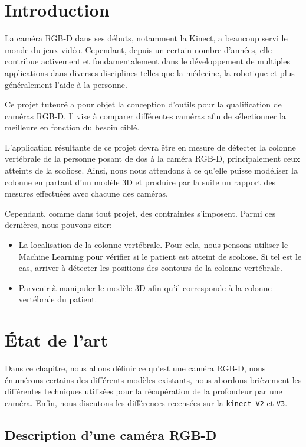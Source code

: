\documentclass[a4paper, 12pt]{book}
\begin{document}
\chapter*{Introduction}
La caméra RGB-D dans ses débuts, notamment la Kinect, a beaucoup
servi le monde du jeux-vidéo. Cependant, depuis un certain nombre d'années, elle contribue activement et fondamentalement dans le développement
de multiples applications dans diverses disciplines telles que la médecine, la
robotique et plus généralement l'aide à la personne.
\par Ce projet tuteuré a pour objet la conception d'outils pour la qualification de caméras RGB-D. Il vise à comparer différentes caméras afin de sélectionner la meilleure en
fonction du besoin ciblé.
\par L'application résultante de ce projet devra être en mesure de détecter la colonne vertébrale de la personne posant de dos à la caméra RGB-D, principalement ceux atteints de la scoliose. Ainsi, nous nous attendons à ce qu'elle puisse modéliser la colonne en partant d'un modèle 3D et produire par la suite un rapport des mesures effectuées avec chacune des caméras. 
\par Cependant, comme dans tout projet, des contraintes s'imposent. Parmi ces dernières, nous pouvons citer:
\begin{itemize}
	\item La localisation de la colonne vertébrale. Pour cela, nous pensons utiliser le Machine Learning pour vérifier si le patient est atteint de scoliose. Si tel est le cas, arriver à détecter les positions des contours de la colonne vertébrale.
	\item Parvenir à manipuler le modèle 3D afin qu'il corresponde à la colonne vertébrale du patient.
\end{itemize}

\chapter{État de l'art}

Dans ce chapitre, nous allons définir ce qu'est une caméra RGB-D, nous énumérons certains des différents modèles existants, nous abordons brièvement les différentes techniques utilisées pour la récupération de la profondeur par une caméra. Enfin, nous discutons les différences recensées sur la \texttt{kinect V2} et \texttt{V3}.

\section{Description d'une caméra RGB-D}
\end{document}
